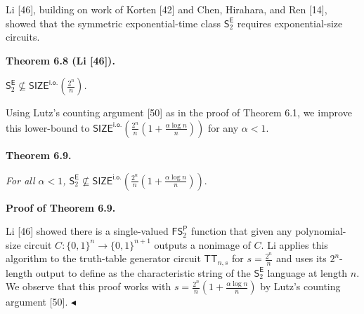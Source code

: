 


Li [46], building on work of Korten [42] and Chen, Hirahara, and Ren [14], showed that the symmetric exponential-time class $\mathsf{S}^{\mathsf{E}}_{2}$ requires exponential-size circuits.\par





\par\medskip\noindent\textbf{
\textbf{Theorem 6.8}\textbf{ }(Li [46])\textbf{.}
}\par



$\mathsf{S}^{\mathsf{E}}_{2}\not\subseteq\mathsf{SIZE}^{\mathsf{i.o.}}\!\!\left(\frac{2^{n}}{n}\right)$\emph{.}\par






Using Lutz’s counting argument [50] as in the proof of Theorem 6.1, we improve this lower-bound to $\mathsf{SIZE}^{\mathsf{i.o.}}\!\!\left(\frac{2^{n}}{n}\!\left(1+\frac{\alpha\log n}{n}\right)\right)$ for any $\alpha<1$.\par





\par\medskip\noindent\textbf{
\textbf{Theorem 6.9}\textbf{.}
}\par



\emph{For all $\alpha<1$, $\mathsf{S}^{\mathsf{E}}_{2}\not\subseteq\mathsf{SIZE}^{\mathsf{i.o.}}\!\!\left(\frac{2^{n}}{n}\!\left(1+\frac{\alpha\log n}{n}\right)\right).$}\par







\par\medskip\noindent\textbf{Proof of Theorem 6.9.}\par




Li [46] showed there is a single-valued $\mathsf{FS}^{\mathsf{P}}_{2}$ function that given any polynomial-size circuit $C:\{0,1\}^{n}\to\{0,1\}^{n+1}$ outputs a nonimage of $C$. Li applies this algorithm to the truth-table generator circuit $\mathsf{TT}_{n,s}$ for $s=\frac{2^{n}}{n}$ and uses its $2^{n}$-length output to define as the characteristic string of the $\mathsf{S}^{\mathsf{E}}_{2}$ language at length $n$. We observe that this proof works with $s=\frac{2^{n}}{n}\!\left(1+\frac{\alpha\log n}{n}\right)$ by Lutz’s counting argument [50].
$\blacktriangleleft$\par






